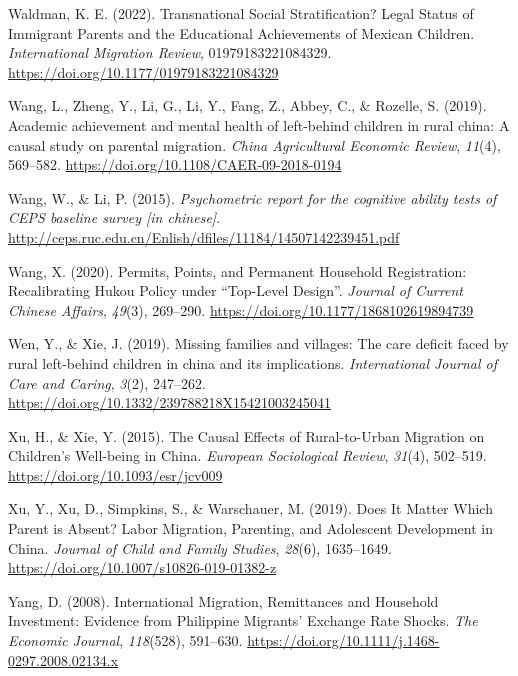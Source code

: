 \documentclass[
  man,floatsintext]{apa7}
\newlength{\cslhangindent}
\newlength{\cslentryspacingunit} %
\newenvironment{CSLReferences}[2] %
 {%
  \setlength{\parindent}{0pt}
  \ifodd #1
  \let\oldpar\par
  \def\par{\hangindent=\cslhangindent\oldpar}
  \fi
  \setlength{\parskip}{#2\cslentryspacingunit}
 }%
 {}
\begin{document}
\begin{CSLReferences}{1}{0}
\leavevmode{}%
Waldman, K. E. (2022). Transnational Social Stratification? Legal Status of Immigrant Parents and the Educational Achievements of Mexican Children. \emph{International Migration Review}, 01979183221084329. \url{https://doi.org/10.1177/01979183221084329}

\leavevmode{}%
Wang, L., Zheng, Y., Li, G., Li, Y., Fang, Z., Abbey, C., \& Rozelle, S. (2019). Academic achievement and mental health of left-behind children in rural china: A causal study on parental migration. \emph{China Agricultural Economic Review}, \emph{11}(4), 569--582. \url{https://doi.org/10.1108/CAER-09-2018-0194}

\leavevmode{}%
Wang, W., \& Li, P. (2015). \emph{Psychometric report for the cognitive ability tests of CEPS baseline survey {[}in chinese{]}}. \url{http://ceps.ruc.edu.cn/Enlish/dfiles/11184/14507142239451.pdf}

\leavevmode{}%
Wang, X. (2020). Permits, Points, and Permanent Household Registration: Recalibrating Hukou Policy under {``}Top-Level Design{''}. \emph{Journal of Current Chinese Affairs}, \emph{49}(3), 269--290. \url{https://doi.org/10.1177/1868102619894739}

\leavevmode{}%
Wen, Y., \& Xie, J. (2019). Missing families and villages: The care deficit faced by rural left-behind children in china and its implications. \emph{International Journal of Care and Caring}, \emph{3}(2), 247--262. \url{https://doi.org/10.1332/239788218X15421003245041}

\leavevmode{}%
Xu, H., \& Xie, Y. (2015). The Causal Effects of Rural-to-Urban Migration on Children{'}s Well-being in China. \emph{European Sociological Review}, \emph{31}(4), 502--519. \url{https://doi.org/10.1093/esr/jcv009}

\leavevmode{}%
Xu, Y., Xu, D., Simpkins, S., \& Warschauer, M. (2019). Does It Matter Which Parent is Absent? Labor Migration, Parenting, and Adolescent Development in China. \emph{Journal of Child and Family Studies}, \emph{28}(6), 1635--1649. \url{https://doi.org/10.1007/s10826-019-01382-z}

\leavevmode{}%
Yang, D. (2008). International Migration, Remittances and Household Investment: Evidence from Philippine Migrants{'} Exchange Rate Shocks. \emph{The Economic Journal}, \emph{118}(528), 591--630. \url{https://doi.org/10.1111/j.1468-0297.2008.02134.x}


\end{CSLReferences}
\end{document}
